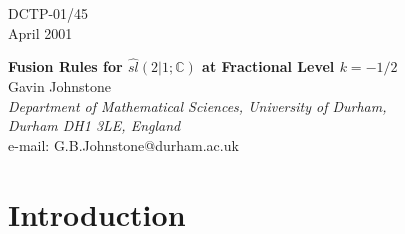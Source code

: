 \documentclass[a4paper,12pt]{article}
\def\C           {\mathbb C}
\def\hslc        {\hat{sl}(2|1;{\mathbb C})}
\def\hslck       {\hat{sl}(2|1;{\mathbb C})_k}
\begin{document}

\begin{titlepage}
\begin{flushright}
DCTP-01/45\\
April 2001\\
\end{flushright}
\vspace{1cm}
\begin{center}
{\Large\bf Fusion Rules for $\hslc$ at Fractional Level $k=-1/2$}\\
\vspace{1cm}
{\large Gavin Johnstone}\\
\vspace{0.5cm}
{\it Department of Mathematical Sciences, University of Durham, \\Durham DH1 3LE, England}\\
\vspace{0.5cm}
e-mail: G.B.Johnstone@durham.ac.uk
\end{center}
\vspace{2cm}


\begin{abstract}

We calculate fusion rules for the admissible representations of the
superalgebra $\hslck$ at fractional level $k=-1/2$ in the Ramond sector.  
By representing 3-point correlation functions involving a singular
vector as the action of differential operators on the $sl(2|1;\C)$ invariant
3-point function, we obtain conditions on permitted quantum
numbers involved.  We find that in this case the primary fields close
under fusion.  


\end{abstract}



\end{titlepage}



\section{Introduction}
\end{document}
